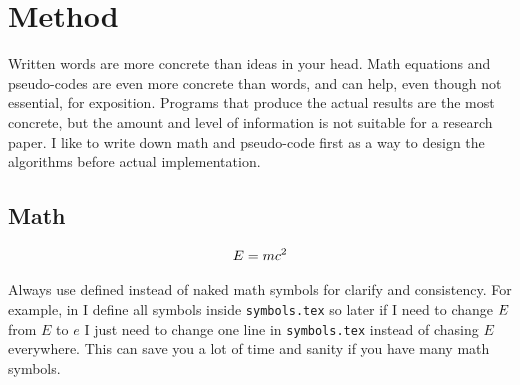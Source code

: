 \section{Method}
\label{sec:method}

Written words are more concrete than ideas in your head.
Math equations and pseudo-codes are even more concrete than words, and can help, even though not essential, for exposition.
Programs that produce the actual results are the most concrete, but the amount and level of information is not suitable for a research paper.
I like to write down math and pseudo-code first as a way to design the algorithms before actual implementation.

\subsection{Math}
\label{sec:method:math}

\begin{align}
E = m c^2
\label{eqn:emc2}
\end{align}

Always use defined instead of naked math symbols for clarify and consistency.
For example, in  I define all symbols inside \texttt{symbols.tex} so later if I need to change $E$ from $E$ to $e$ I just need to change one line in \texttt{symbols.tex} instead of chasing $E$ everywhere.
This can save you a lot of time and sanity if you have many math symbols.